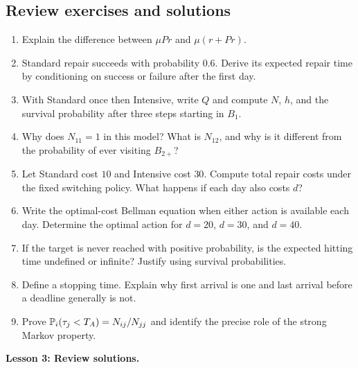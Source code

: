 \documentclass[11pt]{article}
\theoremstyle{remark}\newtheorem{remark}[definition]{Remark}
\begin{document}
\subsection{Review exercises and solutions}
\begin{enumerate}
\item Explain the difference between $\mu Pr$ and $\mu(r+Pr)$.
\item Standard repair succeeds with probability $0.6$. Derive its expected repair time by conditioning on success or failure after the first day.
\item With Standard once then Intensive, write $Q$ and compute $N$, $h$, and the survival probability after three steps starting in $B_1$.
\item Why does $N_{11}=1$ in this model? What is $N_{12}$, and why is it different from the probability of ever visiting $B_{2+}$?
\item Let Standard cost $10$ and Intensive cost $30$. Compute total repair costs under the fixed switching policy. What happens if each day also costs $d$?
\item Write the optimal-cost Bellman equation when either action is available each day. Determine the optimal action for $d=20$, $d=30$, and $d=40$.
\item If the target is never reached with positive probability, is the expected hitting time undefined or infinite? Justify using survival probabilities.
\item Define a stopping time. Explain why first arrival is one and last arrival before a deadline generally is not.
\item Prove $\mathbb P_i(\tau_j<T_A)=N_{ij}/N_{jj}$ and identify the precise role of the strong Markov property.
\end{enumerate}
\clearpage
\textbf{Lesson 3: Review solutions.}
\end{document}
